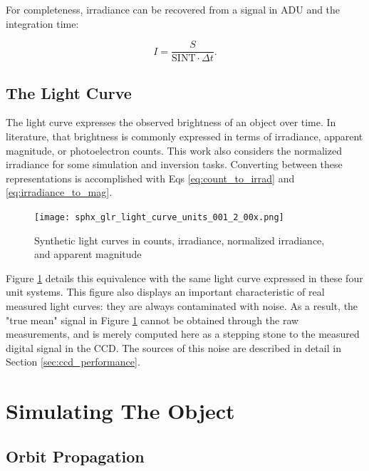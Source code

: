 For completeness, irradiance can be recovered from a signal in ADU and the integration time:

\begin{equation} \label{eq:count_to_irrad}
  I = \frac{S}{\textrm{SINT} \cdot \Delta t}.
\end{equation}

\subsection{The Light Curve}

The light curve expresses the observed brightness of an object over time. In literature, that brightness is commonly expressed in terms of irradiance, apparent magnitude, or photoelectron counts. This work also considers the normalized irradiance for some simulation and inversion tasks. Converting between these representations is accomplished with Eqs \ref{eq:count_to_irrad} and \ref{eq:irradiance_to_mag}.

\begin{figure}[!htb]
  \centering
  \texttt{[image: sphx\_glr\_light\_curve\_units\_001\_2\_00x.png]}
  \caption{Synthetic light curves in counts, irradiance, normalized irradiance, and apparent magnitude}
  \label{fig:light_curve_units}
\end{figure}

Figure \ref{fig:light_curve_units} details this equivalence with the same light curve expressed in these four unit systems. This figure also displays an important characteristic of real measured light curves: they are always contaminated with noise. As a result, the "true mean" signal in Figure \ref{fig:light_curve_units} cannot be obtained through the raw measurements, and is merely computed here as a stepping stone to the measured digital signal in the CCD. The sources of this noise are described in detail in Section \ref{sec:ccd_performance}.

\section{Simulating The Object}

\subsection{Orbit Propagation}

